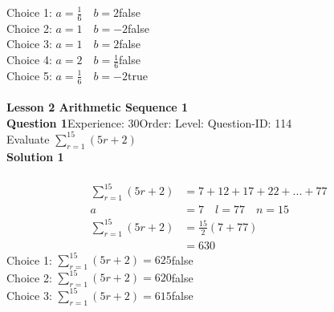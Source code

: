 \documentclass{article}
\begin{document}
Choice 1: \hspace{20pt}$a=\displaystyle\frac{1}{6}\quad b=2$\hspace{20pt}false\\
Choice 2: \hspace{20pt}$a=1 \quad b=-2$\hspace{20pt}false\\
Choice 3: \hspace{20pt}$a=1 \quad b=2$\hspace{20pt}false\\
Choice 4: \hspace{20pt}$a=2 \quad b=\displaystyle\frac{1}{6}$\hspace{20pt}false\\
Choice 5: \hspace{20pt}$a=\displaystyle\frac{1}{6} \quad b=-2$\hspace{20pt}true\\
\\[4pt]
\noindent\large{\textbf{Lesson 2 Arithmetic Sequence 1}}\\[12pt]
\noindent\textbf{Question 1}\hspace{20pt}Experience: 30\hspace{20pt}Order: \hspace{20pt}Level: \hspace{20pt}Question-ID: 114\\[2pt]
Evaluate $\displaystyle\sum_{r=1}^{15} (5r+2)$\\[4pt]
\noindent\textbf{Solution 1}\\[2pt]
\\[-35pt]\begin{align*}
\displaystyle\sum_{r=1}^{15} (5r+2)&=7+12+17+22+...+77\\[2pt]
a&=7\quad l=77 \quad n=15\\[2pt]
\displaystyle\sum_{r=1}^{15} (5r+2)&=\displaystyle\frac{15}{2}(7+77)\\[2pt]
&=630
\end{align*}
Choice 1: \hspace{20pt}$\displaystyle\sum_{r=1}^{15} (5r+2)=625$\hspace{20pt}false\\
Choice 2: \hspace{20pt}$\displaystyle\sum_{r=1}^{15} (5r+2)=620$\hspace{20pt}false\\
Choice 3: \hspace{20pt}$\displaystyle\sum_{r=1}^{15} (5r+2)=615$\hspace{20pt}false\\
\end{document}

